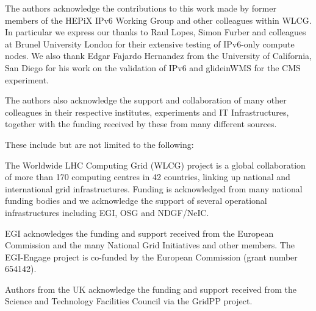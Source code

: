 
The authors acknowledge the contributions to this work made by former members of the HEPiX IPv6 Working Group and other colleagues within WLCG. In particular we express our thanks to Raul Lopes, Simon Furber and colleagues at Brunel University London for their extensive testing of IPv6-only compute nodes. We also thank Edgar Fajardo Hernandez from the University of California, San Diego for his work on the validation of IPv6 and glideinWMS for the CMS experiment.

The authors also acknowledge the support and collaboration of many other colleagues in their respective institutes, experiments and IT Infrastructures, together with the funding received by these from many different sources. 

These include but are not limited to the following:

The Worldwide LHC Computing Grid (WLCG) project is a global collaboration of more than 170 computing centres in 42 countries, linking up national and international grid infrastructures. Funding is acknowledged from many national funding bodies and we acknowledge the support of several operational infrastructures including EGI, OSG and NDGF/NeIC.

EGI acknowledges the funding and support received from the European Commission and the many National Grid Initiatives and other members. The EGI-Engage project is co-funded by the European Commission (grant number 654142).

Authors from the UK acknowledge the funding and support received from the Science and Technology Facilities Council via the GridPP project.



